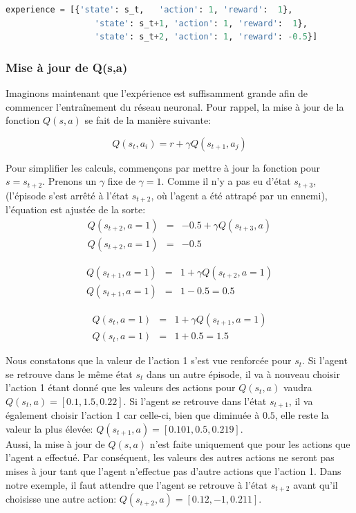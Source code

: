 \documentclass[11pt,a4paper]{report}
\begin{document}
  \begin{lstlisting}[language=python]
   experience = [{'state': s_t,   'action': 1, 'reward':  1},
                  'state': s_t+1, 'action': 1, 'reward':  1},
                  'state': s_t+2, 'action': 1, 'reward': -0.5}]
  \end{lstlisting}    
  
  \subsubsection{Mise à jour de Q(s,a)}
  
  \par Imaginons maintenant que l'expérience est suffisamment grande afin de commencer l’entraînement du réseau neuronal. Pour rappel, la mise à jour de la fonction $Q(s,a)$ se fait de la manière suivante: 
  
  $$Q(s_t,a_i) = r + \gamma Q(s_{t+1}, a_j)$$ 
  
  \par Pour simplifier les calculs, commençons par mettre à jour la fonction pour $s = s_{t+2}$. Prenons un $\gamma$ fixe de $\gamma=1$. Comme il n'y a pas eu d'état $s_{t+3}$, (l'épisode s'est arrêté à l'état $s_{t+2}$, où l'agent a été attrapé par un ennemi), l'équation est ajustée de la sorte:
  \begin{eqnarray}
  Q(s_{t+2},a=1) &=& -0.5 + \gamma Q(s_{t+3},a) \\
  Q(s_{t+2},a=1) &=& -0.5 
  \end{eqnarray}
  
 \begin{eqnarray}
  Q(s_{t+1},a=1) &=&  1 + \gamma Q(s_{t+2},a=1) \\
  Q(s_{t+1},a=1) &=&  1 - 0.5 = 0.5 
  \end{eqnarray}
  
 \begin{eqnarray}
  Q(s_t,a=1) &=&  1 + \gamma Q(s_{t+1},a=1) \\
  Q(s_t,a=1) &=&  1 + 0.5 = 1.5
  \end{eqnarray}
  
  \par Nous constatons que la valeur de l'action 1 s'est vue renforcée pour $s_t$. Si l'agent se retrouve dans le même état $s_t$ dans un autre épisode, il va à nouveau choisir l'action 1 étant donné que les valeurs des actions pour $Q(s_t,a)$ vaudra $Q(s_t, a) = [0.1, 1.5, 0.22]$. Si l'agent se retrouve dans l'état $s_{t+1}$, il va également choisir l'action 1 car celle-ci, bien que diminuée à $0.5$, elle reste la valeur la plus élevée: $Q(s_{t+1}, a) = [0.101, 0.5, 0.219]$. \\
  Aussi, la mise à jour de $Q(s,a)$ n'est faite uniquement que pour les actions que l'agent a effectué. Par conséquent, les valeurs des autres actions ne seront pas mises à jour tant que l'agent n'effectue pas d'autre actions que l'action 1. Dans notre exemple, il faut attendre que l'agent se retrouve à l'état $s_{t+2}$ avant qu'il choisisse une autre action: $Q(s_{t+2}, a) = [0.12, -1, 0.211]$.  
  
\end{document}
